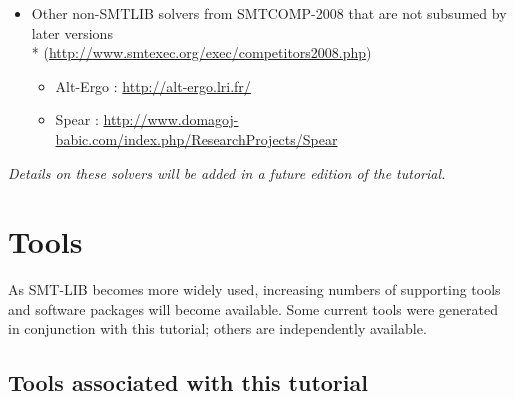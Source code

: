 \documentclass[12pt,oneside]{report}
\begin{document}
\begin{itemize}
\begin{itemize}
\item barcelogic-QF\_NIA : \url{http://www.lsi.upc.edu/~oliveras/bclt-main.html}
\item beaver-smtcomp-2009 : \\* \url{http://uclid.eecs.berkeley.edu/newwiki/beaver/start}
\item Boolector 1.2 : \url{http://fmv.jku.at/boolector/}
\item clsat 1.0
\item SatEEn-3.5 : \url{http://vlsi.colorado.edu/~hhkim/sateen/}
\item sword-1.0 : \url{http://www.informatik.uni-bremen.de/agra/eng/sword.php}
\item Yices 2 proto : \url{http://yices.csl.sri.com/}
\end{itemize}
\item Other non-SMTLIB solvers from SMTCOMP-2008 that are not subsumed by later versions\\*
 (\url{http://www.smtexec.org/exec/competitors2008.php})
\begin{itemize} 
\item Alt-Ergo : \url{http://alt-ergo.lri.fr/}
\item Spear : \url{http://www.domagoj-babic.com/index.php/ResearchProjects/Spear}
\end{itemize}
\end{itemize}

{\it Details on these solvers will be added in a future edition of the tutorial.} %

\chapter{Tools}

As SMT-LIB becomes more widely used, increasing numbers of supporting tools and software packages will become available. 
Some current tools
were generated in conjunction with this tutorial; others are independently available.

\section{Tools associated with this tutorial}

\end{document}
